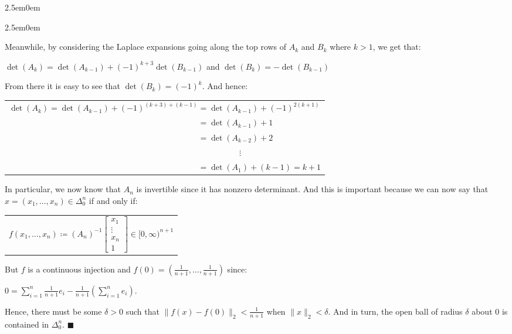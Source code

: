 \documentclass{book}
\newenvironment{myIndent}{%
   \begin{adjustwidth}{2.5em}{0em}%
}{%
   \end{adjustwidth}%
}
\newcommand{\retTwo}{\hfill\bigbreak}
\begin{document}
\begin{myIndent}
\begin{myIndent}
		Meanwhile, by considering the Laplace expansions going along the top rows of $A_k$ and $B_k$ where $k > 1$, we get that:
		
		{\centering$\det(A_k) = \det(A_{k-1}) + (-1)^{k+3}\det(B_{k-1})$ and $\det(B_k) = -\det(B_{k-1})$\retTwo\par}

		From there it is easy to see that $\det(B_k) = (-1)^{k}$. And hence:
		
		{\centering\begin{tabular}{l}
			$\det(A_k) = \det(A_{k-1}) + (-1)^{(k + 3) + (k - 1)} = \det(A_{k-1}) + (-1)^{2(k + 1)}$\\
			$\phantom{\det(A_k) = \det(A_{k-1}) + (-1)^{(k + 3) + (k - 1)}} = \det(A_{k-1}) + 1$\\
			$\phantom{\det(A_k) = \det(A_{k-1}) + (-1)^{(k + 3) + (k - 1)}} = \det(A_{k-2}) + 2$\\
			$\phantom{\det(A_k) = \det(A_{k-1}) + (-1)^{(k + 3) + (k - 1)} = aaaaaaa} \vdots$\\
			$\phantom{\det(A_k) = \det(A_{k-1}) + (-1)^{(k + 3) + (k - 1)}} = \det(A_1) + (k-1) = k+1$\\
		\end{tabular}\retTwo\par}
	\end{myIndent}
	
	In particular, we now know that $A_n$ is invertible since it has nonzero determinant. And this is important because we can now say that $x = (x_1, \ldots, x_n) \in \Delta_0^n$ if and only if:
	
	{\centering\begin{tabular}{l}
		$f(x_1, \ldots, x_n) \coloneqq (A_n)^{-1}\left[\begin{smallmatrix} x_1 \\ \vdots \\ x_n \\ 1 \end{smallmatrix}\right] \in [0, \infty)^{n+1}$
	\end{tabular}\newpage\par}

	But $f$ is a continuous injection and $f(0) = (\frac{1}{n+1}, \ldots, \frac{1}{n+1})$ since:
	
	{\centering$0 = \sum_{i=1}^n \frac{1}{n + 1}e_i - \frac{1}{n+1}(\sum_{i=1}^n e_i)$.\retTwo\par}

	Hence, there must be some $\delta > 0$ such that $\|f(x) - f(0)\|_2 < \frac{1}{n+1}$ when $\|x\|_2 < \delta$. And in turn, the open ball of radius $\delta$ about $0$ is contained in $\Delta_0^n$. $\blacksquare$\retTwo
\end{myIndent}
\end{document}
